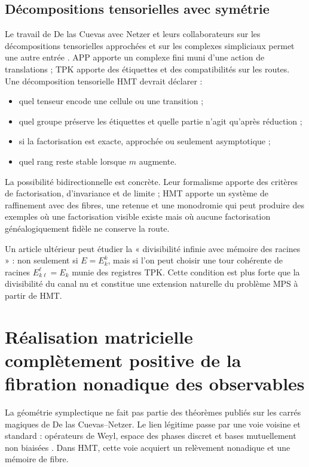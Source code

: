 \subsection{Décompositions tensorielles avec symétrie}

Le travail de De las Cuevas avec Netzer et leurs collaborateurs sur les
décompositions tensorielles approchées et sur les complexes simpliciaux
permet une autre entrée \citep{delascuevas2021approximate,
delascuevas2024simplicial}. APP apporte un complexe fini muni d'une action de
translations ; TPK apporte des étiquettes et des compatibilités sur les routes. Une
décomposition tensorielle HMT devrait déclarer :

\begin{itemize}
 \item quel tenseur encode une cellule ou une transition ;
 \item quel groupe préserve les étiquettes et quelle partie n'agit qu'après
 réduction ;
 \item si la factorisation est exacte, approchée ou seulement asymptotique ;
 \item quel rang reste stable lorsque $m$ augmente.
\end{itemize}

La possibilité bidirectionnelle est concrète. Leur formalisme apporte des critères de
factorisation, d'invariance et de limite ; HMT apporte un système de raffinement avec
des fibres, une retenue et une monodromie qui peut produire des exemples où une
factorisation visible existe mais où aucune factorisation généalogiquement fidèle
ne conserve la route.

\begin{workbox}
Un article ultérieur peut étudier la « divisibilité infinie avec mémoire des
racines » : non seulement si $E=E_k^k$, mais si l'on peut choisir une tour cohérente de
racines $E_{k\ell}^\ell=E_k$ munie des registres TPK. Cette condition est
plus forte que la divisibilité du canal nu et constitue une extension
naturelle du problème MPS à partir de HMT.
\end{workbox}
\fi


\section{Réalisation matricielle complètement positive de la fibration nonadique des observables}
\label{p12-83-c22-s8:gmc:chap:simplectica}

La géométrie symplectique ne fait pas partie des théorèmes publiés sur
les carrés magiques de De las Cuevas--Netzer. Le lien légitime passe par une
voie voisine et standard : opérateurs de Weyl, espace des phases discret et
bases mutuellement non biaisées \citep{gibbons2004phase,planat2007rings}. Dans HMT,
cette voie acquiert un relèvement nonadique et une mémoire de fibre.

